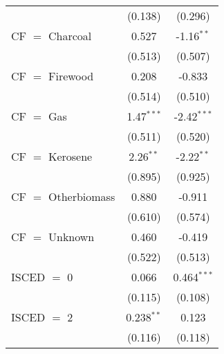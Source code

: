 \begin{table}[htbp!]
\begin{adjustbox}{width = 1\textwidth, max height = 0.95\textheight, center}
\begin{threeparttable}[b]
\begin{tabular}{lcc}
                                                                                      & (0.138)       & (0.296)\\   
            CF $=$ Charcoal                                                           & 0.527         & -1.16$^{**}$\\   
                                                                                      & (0.513)       & (0.507)\\   
            CF $=$ Firewood                                                           & 0.208         & -0.833\\   
                                                                                      & (0.514)       & (0.510)\\   
            CF $=$ Gas                                                                & 1.47$^{***}$  & -2.42$^{***}$\\   
                                                                                      & (0.511)       & (0.520)\\   
            CF $=$ Kerosene                                                           & 2.26$^{**}$   & -2.22$^{**}$\\   
                                                                                      & (0.895)       & (0.925)\\   
            CF $=$ Otherbiomass                                                       & 0.880         & -0.911\\   
                                                                                      & (0.610)       & (0.574)\\   
            CF $=$ Unknown                                                            & 0.460         & -0.419\\   
                                                                                      & (0.522)       & (0.513)\\   
            ISCED $=$ 0                                                               & 0.066         & 0.464$^{***}$\\   
                                                                                      & (0.115)       & (0.108)\\   
            ISCED $=$ 2                                                               & 0.238$^{**}$  & 0.123\\   
                                                                                      & (0.116)       & (0.118)\\   

\end{tabular}
\end{threeparttable}
\end{adjustbox}
\end{table}
